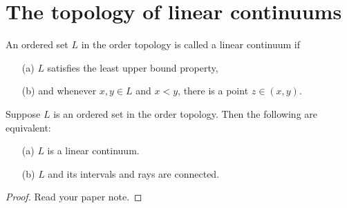 \section{The topology of linear continuums}

\begin{defi}
    An ordered set $L$ in the order topology is called a linear continuum if
    \begin{enumerate}
        \item[(a)] $L$ satisfies the least upper bound property,
        \item[(b)] and whenever $x, y\in L$ and $x<y$, there is a point $z\in (x, y)$.
    \end{enumerate}
\end{defi}
\begin{thm}
    Suppose $L$ is an ordered set in the order topology.
    Then the following are equivalent:
    \begin{enumerate}
        \item[(a)]
        {
            $L$ is a linear continuum.
        }
        \item[(b)]
        {
            $L$ and its intervals and rays are connected.
        }
    \end{enumerate}
\end{thm}
\begin{proof}
    \color{red}Read your paper note.\color{black}
\end{proof}